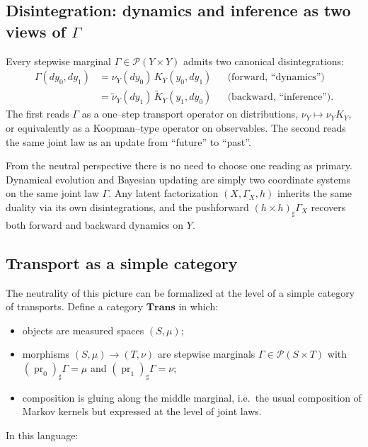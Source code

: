 \documentclass[11pt]{article}
\newcommand{\1}{\mathbf{1}}
\begin{document}
\subsection{Disintegration: dynamics and inference as two views of \texorpdfstring{\(\Gamma\)}{Γ}}

Every stepwise marginal \(\Gamma \in \mathcal{P}(Y \times Y)\) admits two canonical disintegrations:
\begin{align*}
  \Gamma(dy_0,dy_1)
  &= \nu_Y(dy_0)\, K_Y(y_0,dy_1)
    &&\text{(forward, ``dynamics'')} \\
  &= \tilde\nu_Y(dy_1)\, \tilde K_Y(y_1,dy_0)
    &&\text{(backward, ``inference'')}.
\end{align*}
The first reads \(\Gamma\) as a one–step transport operator on distributions, \(\nu_Y \mapsto \nu_Y K_Y\), or equivalently as a Koopman–type operator on observables. The second reads the same joint law as an update from ``future'' to ``past''.

From the neutral perspective there is no need to choose one reading as primary. Dynamical evolution and Bayesian updating are simply two coordinate systems on the same joint law \(\Gamma\). Any latent factorization \((X,\Gamma_X,h)\) inherits the same duality via its own disintegrations, and the pushforward \((h \times h)_\sharp \Gamma_X\) recovers both forward and backward dynamics on \(Y\).

\subsection{Transport as a simple category}

The neutrality of this picture can be formalized at the level of a simple category of transports. Define a category \(\mathbf{Trans}\) in which:

\begin{itemize}
  \item objects are measured spaces \((S,\mu)\);
  \item morphisms \((S,\mu) \to (T,\nu)\) are stepwise marginals
        \(\Gamma \in \mathcal{P}(S \times T)\) with
        \((\operatorname{pr}_0)_\sharp \Gamma = \mu\) and \((\operatorname{pr}_1)_\sharp \Gamma = \nu\);
  \item composition is gluing along the middle marginal, i.e.\ the usual composition of Markov
        kernels but expressed at the level of joint laws.
\end{itemize}

In this language:
\end{document}
